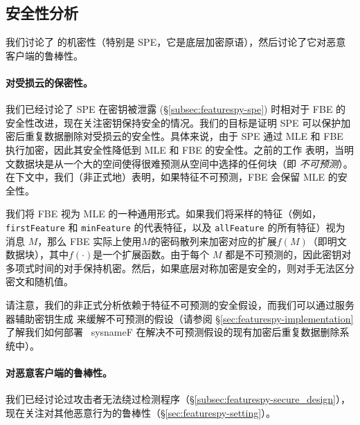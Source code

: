 \subsection{安全性分析}
\label{subsec:featurespy-security}
我们讨论了 \sysnameF 的机密性（特别是 SPE，它是底层加密原语），然后讨论了它对恶意客户端的鲁棒性。

\paragraph*{对受损云的保密性。}
我们已经讨论了 SPE 在密钥被泄露 (\S\ref{subsec:featurespy-spe}) 时相对于 FBE 的安全性改进，现在关注密钥保持安全的情况。我们的目标是证明 SPE 可以保护加密后重复数据删除对受损云的安全性。具体来说，由于 SPE 通过 MLE 和 FBE 执行加密，因此其安全性降低到 MLE 和 FBE 的安全性。之前的工作 \cite{bellare2013MLE} 表明，当明文数据块是从一个大的空间使得很难预测从空间中选择的任何块（即 {\em 不可预测}）。在下文中，我们（非正式地）表明，如果特征不可预测，FBE 会保留 MLE 的安全性。


我们将 FBE 视为 MLE 的一种通用形式。如果我们将采样的特征（例如，{\tt firstFeature} 和 {\tt minFeature} 的代表特征，以及 {\tt allFeature} 的所有特征）视为消息 $M$，那么 FBE 实际上使用$M$的密码散列来加密对应的扩展$f(M)$（即明文数据块），其中$f(\cdot)$是一个扩展函数。由于每个 $M$ 都是不可预测的，因此密钥对多项式时间的对手保持机密。然后，如果底层对称加密是安全的，则对手无法区分密文和随机值。

请注意，我们的非正式分析依赖于特征不可预测的安全假设，而我们可以通过服务器辅助密钥生成 \cite{bellare13b} 来缓解不可预测的假设（请参阅 \S\ref{sec:featurespy-implementation} 了解我们如何部署 \ sysnameF 在解决不可预测假设的现有加密后重复数据删除系统中）。


\paragraph*{对恶意客户端的鲁棒性。}
我们已经讨论过攻击者无法绕过检测程序（\S\ref{subsec:featurespy-secure_design}），现在关注对其他恶意行为的鲁棒性（\S\ref{sec:featurespy-setting}）。


